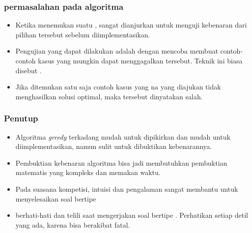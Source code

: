 \begin{frame}
	\frametitle{permasalahan pada algoritma }
	\begin{itemize}
		\item Ketika menemukan suatu , sangat dianjurkan untuk menguji kebenaran dari pilihan tersebut sebelum diimplementasikan.
		\item Pengujian yang dapat dilakukan adalah dengan mencoba membuat contoh-contoh kasus yang mungkin dapat menggagalkan  tersebut. Teknik ini biasa disebut .
		\item Jika ditemukan satu saja contoh kasus yang na  yang diajukan tidak menghasilkan solusi optimal, maka  tersebut dinyatakan salah.
	\end{itemize}
\end{frame}

\begin{frame}
\frametitle{Penutup}
\begin{itemize}
		\item Algoritma \textit{greedy} terkadang mudah untuk dipikirkan dan mudah untuk diimplementasikan, namun sulit untuk dibuktikan kebenarannya.
		\item Pembuktian kebenaran algoritma  bisa jadi membutuhkan pembuktian matematis yang kompleks dan memakan waktu. 
		\item Pada suasana kompetisi, intuisi dan pengalaman sangat membantu untuk menyelesaikan soal bertipe 
		\item  berhati-hati dan telili saat mengerjakan soal bertipe . Perhatikan setiap detil yang ada, karena  bisa berakibat fatal.
		
\end{itemize}
\end{frame}


